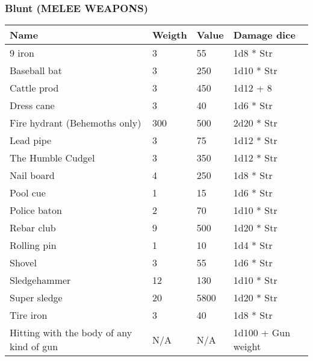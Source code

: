 
\subsubsection{Blunt (MELEE WEAPONS)}
\begin{longtable}{|p{4cm}|p{1.5cm}|p{1.5cm}|p{4cm}|}
\hline
\bfseries Name &  \bfseries Weigth & \bfseries Value & \bfseries Damage dice \\
\hline
\endhead
9 iron  & 3 & 55 & 1d8 * Str \\
Baseball bat & 3 & 250 & 1d10 * Str \\
Cattle prod  & 3 & 450 & 1d12 + 8 \\
Dress cane  & 3 & 40 & 1d6 * Str \\
Fire hydrant (Behemoths only) & 300 & 500 & 2d20 * Str \\
Lead pipe  & 3 & 75 & 1d12 * Str \\
The Humble Cudgel  & 3 & 350 & 1d12 * Str \\
Nail board  & 4 & 250 & 1d8 * Str \\
Pool cue  & 1 & 15 & 1d6 * Str \\
Police baton  & 2 & 70 & 1d10 * Str \\
Rebar club  & 9 & 500 & 1d20 * Str \\
Rolling pin  & 1 & 10 & 1d4 * Str \\
Shovel  & 3 & 55 & 1d6 * Str \\
Sledgehammer  & 12 & 130 & 1d10 * Str \\
Super sledge  & 20 & 5800 & 1d20 * Str \\
Tire iron  & 3 & 40 & 1d8 * Str \\
Hitting with the body of any kind of gun & N/A & N/A & 1d100 + Gun weight  \\
\hline
\end{longtable}
